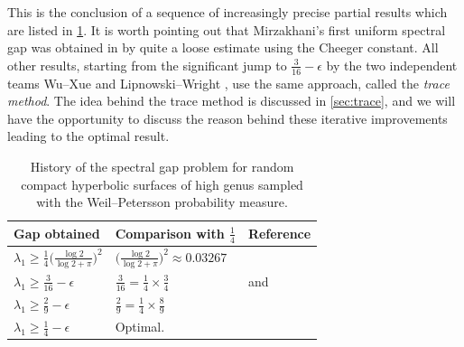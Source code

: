 \documentclass[12pt,twoside]{article}
\theoremstyle{theorem}
\theoremstyle{remark}
\theoremstyle{definition}
\theoremstyle{example}
\newcommand{\1}[1]{\mathds{1}_{#1}}
\begin{document}
This is the conclusion of a sequence of increasingly precise partial results which are listed in
\cref{tab:gaps}. It is worth pointing out that Mirzakhani's first uniform spectral gap was obtained
in \cite{mirzakhani2013} by quite a loose estimate using the Cheeger constant. All other results,
starting from the significant jump to $\frac{3}{16}-\epsilon$ by the two independent teams Wu--Xue
\cite{wu2022} and Lipnowski--Wright \cite{lipnowski2024}, use the same approach, called the
\emph{trace method}. The idea behind the trace method is discussed in \cref{sec:trace}, and we will
have the opportunity to discuss the reason behind these iterative improvements leading to the optimal
result. 

\def\arraystretch{1.5}
\begin{table}[h]
  \centering
  \begin{tabular}{|l|l|l|}
    \hline
    Gap obtained & Comparison with $\frac 14$ & Reference \\
    \hline
    $\lambda_1 \geq \frac 14 \big(\frac{\log 2}{\log 2+\pi}\big)^2
    $
    & $ \big(\frac{\log 2}{\log 2+\pi}\big)^2 \approx 0.03267$
    & \cite{mirzakhani2013} \\
    \hline
    $\lambda_1 \geq \frac{3}{16}-\epsilon$
    & $\frac{3}{16} = \frac 14 \times \frac 34$
    & \cite{wu2022} and \cite{lipnowski2024}  \\
    \hline
    $\lambda_1 \geq \frac 29 - \epsilon$
    & $\frac{2}{9} = \frac 14 \times \frac 89$  
                                              & \cite{anantharaman2023}\\
    \hline
    $\lambda_1 \geq \frac 14 - \epsilon$
                 & Optimal.
                                              & \cite{anantharaman2025}\\
    \hline
  \end{tabular}
  \caption{History of the spectral gap problem for random compact hyperbolic surfaces of high genus
    sampled with the Weil--Petersson probability measure.}
  \label{tab:gaps}
\end{table}
\end{document}
